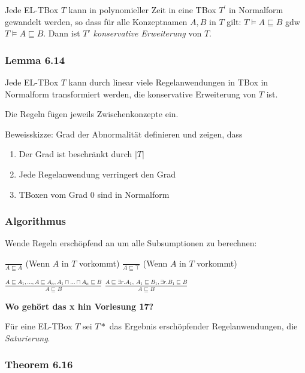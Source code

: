 Jede EL-TBox $T$ kann in polynomieller Zeit in eine TBox $T^{'}$ in
Normalform gewandelt werden, so dass für alle Konzeptnamen $A,B$ in
$T$ gilt: $T \models A \sqsubseteq B$ gdw
$T \models A \sqsubseteq B$. Dann ist $T'$ \emph{konservative
Erweiterung} von $T$.

\subsubsection{Lemma 6.14}\label{lemma-6.14-1}

Jede EL-TBox $T$ kann durch linear viele Regelanwendungen in TBox in
Normalform transformiert werden, die konservative Erweiterung von $T$
ist.

Die Regeln fügen jeweils Zwischenkonzepte ein.

Beweisskizze: Grad der Abnormalität definieren und zeigen, dass

\begin{enumerate}
\def\labelenumi{\arabic{enumi}.}
\item
  Der Grad ist beschränkt durch $\left| T \right|$
\item
  Jede Regelanwendung verringert den Grad
\item
  TBoxen vom Grad $0$ sind in Normalform
\end{enumerate}

\subsubsection{Algorithmus}\label{algorithmus}

Wende Regeln erschöpfend an um alle Subsumptionen zu berechnen:

$\frac{\ }{A \sqsubseteq A}$ (Wenn $A$ in $T$ vorkommt)
$\frac{\ }{A \sqsubseteq \top}$ (Wenn $A$ in $T$ vorkommt)

$\frac{A \sqsubseteq A_1,\ldots,A \sqsubseteq A_{n},A_1 \sqcap \ldots \sqcap A_{n} \sqsubseteq B}{A \sqsubseteq B}$
$\frac{A \sqsubseteq \exists r.A_1,\ A_1 \sqsubseteq B_1,\exists r.B_1 \sqsubseteq B}{A \sqsubseteq B}$

\textbf{Wo gehört das x hin Vorlesung 17?}

Für eine EL-TBox $T$ sei $T*$ das Ergebnis erschöpfender
Regelanwendungen, die \emph{Saturierung}.

\subsubsection{Theorem 6.16 }\label{theorem-6.16}

